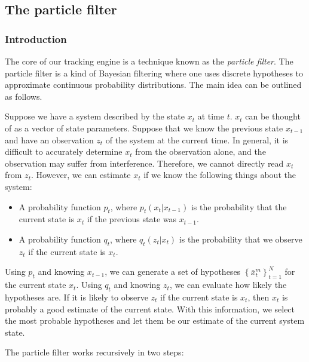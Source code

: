 \newcommand{\xtmN}[4]{
  \left\{#1_{#2}^{#3}\right\}_{#2=1}^{#4}
}
\newcommand{\interval}[2]{
  \left[#1, #2\right]
}
\newcommand{\bel}[1]{
  bel\left(#1\right)
}

\subsection{The particle filter}
\subsubsection{Introduction}
The core of our tracking engine is a technique known as the \emph{particle filter}. The particle filter is a kind of Bayesian filtering where one uses discrete hypotheses to approximate continuous probability distributions. The main idea can be outlined as follows.

Suppose we have a system described by the state $x_t$ at time $t$. $x_t$ can be thought of as a vector of state parameters. Suppose that we know the previous state $x_{t-1}$ and have an observation $z_t$ of the system at the current time. In general, it is difficult to accurately determine $x_t$ from the observation alone, and the observation may suffer from interference. Therefore, we cannot directly read $x_t$ from $z_t$. However, we can estimate $x_t$ if we know the following things about the system:

\begin{itemize}
\item A probability function $p_t$, where $p_t\left(x_t | x_{t-1}\right)$ is the probability that the current state is $x_t$ if the previous state was $x_{t-1}$.
\item A probability function $q_t$, where $q_t\left(z_t | x_t\right)$ is the probability that we observe $z_t$ if the current state is $x_t$.
\end{itemize}

Using $p_t$ and knowing $x_{t-1}$, we can generate a set of hypotheses $\xtmN{\bar{x}}{t}{m}{N}$ for the current state $x_t$. Using $q_t$ and knowing $z_t$, we can evaluate how likely the hypotheses are. If it is likely to observe $z_t$ if the current state is $x_t$, then $x_t$ is probably a good estimate of the current state. With this information, we select the most probable hypotheses and let them be our estimate of the current system state.

The particle filter works recursively in two steps:

